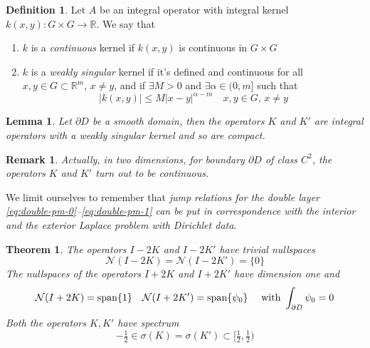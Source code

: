 \documentclass[10pt, a4paper, twoside, openright]{book}
\theoremstyle{definition}
\newtheorem{definition}[subsection]{Definition}
\theoremstyle{plain}
\newtheorem{theorem}[subsection]{Theorem}
\theoremstyle{plain}
\theoremstyle{plain}
\theoremstyle{plain}
\newtheorem{remark}[subsection]{Remark}
\theoremstyle{plain}
\newtheorem{lemma}[subsection]{Lemma}
\theoremstyle{plain}
\theoremstyle{plain}
\theoremstyle{plain}
\begin{document}
\begin{definition}
 Let $A$ be an integral operator with integral kernel $k(x,y):G \times G \to\mathbb{R}$. We say that
 \begin{enumerate}
  \item $k$ is a \emph{continuous} kernel if $k(x,y)$ is continuous in $G\times G$
  \item $k$ is a \emph{weakly singular} kernel if it's defined and continuous for all $x,y\in G\subset \mathbb{R}^m$, $x\neq y$, and if $\exists M>0$ and 
  $\exists \alpha\in (0,m]$ such that
  \begin{equation}
   |k(x,y)|\leq M |x-y|^{\alpha-m}\quad x,y\in G, \, x\neq y
  \end{equation}
 \end{enumerate}

\end{definition}
\begin{lemma}
\label{lemma:K-K'-compact}
 Let $\partial D$ be a smooth domain, then the operators $K$ and $K'$ are integral operators with a weakly singular kernel and so are compact.
\end{lemma}
\begin{remark}
 Actually, in two dimensions, for boundary $\partial D$ of class $C^2$, the operators $K$ and $K'$ turn out to be continuous.
\end{remark}
We limit ourselves to remember that \emph{jump relations for the double layer \eqref{eq:double-pm-0}--\eqref{eq:double-pm-1} can be put in correspondence with the interior and the exterior Laplace problem with Dirichlet data}.
\begin{theorem}
\label{theo:K-nullspace}
 The operators $I-2K$ and $I-2K'$ have trivial nullspaces
 \begin{equation}
  \mathcal{N}(I-2K)=\mathcal{N}(I-2K')=\{0\}
 \end{equation}
 The nullspaces of the operators $I+2K$ and $I+2K'$ have dimension one and
 \begin{equation}
  \mathcal{N}(I+2K)=\textup{span}\{1\} \quad \mathcal{N}(I+2K')=\textup{span}\{\psi_0\}\quad\textup{ with }\int_{\partial D}\psi_0=0
 \end{equation}
 Both the operators $K,K'$ have spectrum
 \begin{equation}
 \label{eq:K-spectrum}
  -\tfrac{1}{2}\in\sigma(K)=\sigma(K')\subset \bigl[\tfrac{1}{2}, \tfrac{1}{2}\bigr)
 \end{equation}
\end{theorem}
\end{document}
